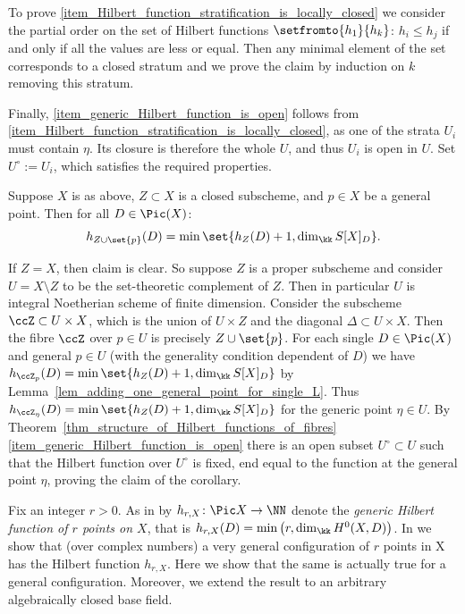 \documentclass[12pt,a4paper]{article}
\begin{document}
\begin{prf}
   To prove \ref{item_Hilbert_function_stratification_is_locally_closed} we consider the partial order on the set of Hilbert functions $\setfromto{h_1}{h_k}$:
    $h_i\leqslant h_j$ if and only if all the values are less or equal.
    Then any minimal element of the set corresponds to a closed stratum and we prove the claim by induction on $k$ removing this stratum.

    Finally, \ref{item_generic_Hilbert_function_is_open} follows from \ref{item_Hilbert_function_stratification_is_locally_closed}, as one of the strata $U_i$ must contain $\eta$. Its closure is therefore the whole $U$, and thus $U_i$ is open in $U$.
    Set $U^{\circ}:=U_i$, which satisfies the required properties.
\end{prf}



\begin{cor}
\label{cor_adding_one_general_point_for_all_L}
Suppose $X$ is as above,
$Z\subset X$ is a closed subscheme, and $p\in X$ be a general point.
Then for all $D\in \Pic(X)$:
\[
  h_{Z\cup \set{p}}(D) = \min \set{ h_{Z}(D) +1, \dim_{\kk}S[X]_{D}}.
\]
\end{cor}
\begin{prf}
   If $Z=X$, then claim is clear.
   So suppose $Z$ is a proper subscheme and consider $U= X\setminus Z$ to be the set-theoretic complement of $Z$.
   Then in particular $U$ is integral Noetherian scheme of finite dimension.
   Consider the subscheme $\ccZ \subset U \times X$, which is the union of $U \times Z$ and the diagonal $\Delta \subset U\times X$.
   Then the fibre $\ccZ$ over $p\in U$ is precisely $Z \cup \set{p}$.
   For each single $D\in \Pic(X)$ and general $p\in U$
   (with the generality condition dependent of $D$)
   we have $h_{\ccZ_{p}}(D)= \min \set{ h_{Z}(D) +1, \dim_{\kk}S[X]_{D}}$
   by Lemma~\ref{lem_adding_one_general_point_for_single_L}.
   Thus $h_{\ccZ_{\eta}}(D)= \min \set{ h_{Z}(D) +1, \dim_{\kk}S[X]_{D}}$ for the generic point $\eta\in U$.
   By Theorem~\ref{thm_structure_of_Hilbert_functions_of_fibres}\ref{item_generic_Hilbert_function_is_open}
   there is an open subset $U^{\circ}\subset U$ such that the Hilbert function over $U^{\circ}$
   is fixed, end equal to the function at the general point $\eta$, proving the claim of the corollary.
\end{prf}

Fix an integer $r>0$.
As in \cite[\S3.2]{nisiabu_jabu_border_apolarity}
  by $h_{r, X}\colon \Pic X \to \NN$
   denote the
  \emph{generic Hilbert function of $r$ points on $X$},
  that is $h_{r, X}(D) = \min \left( r, \dim_{\kk} H^0(X,D)\right)$.
In \cite[Lem.~3.9]{nisiabu_jabu_border_apolarity} we show that (over complex numbers) a very general configuration of $r$ points in X has the Hilbert function $h_{r, X}$.
Here we show that the same is actually true for a general configuration. Moreover, we extend the result to an arbitrary algebraically closed base field.
\end{document}
